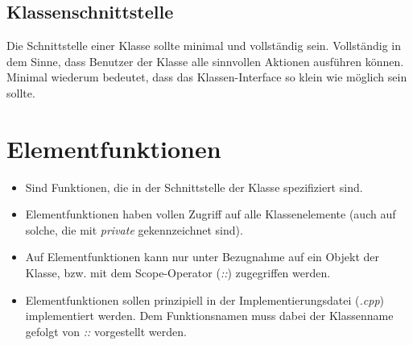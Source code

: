 \subsection{Klassenschnittstelle}
Die Schnittstelle einer Klasse sollte minimal und vollständig sein. Vollständig in dem Sinne, dass Benutzer der Klasse alle sinnvollen Aktionen ausführen können. Minimal wiederum bedeutet, dass das Klassen-Interface so klein wie möglich sein sollte.
\clearpage

\section{Elementfunktionen}
\begin{itemize}
	\item Sind Funktionen, die in der Schnittstelle der Klasse spezifiziert sind.
	\item Elementfunktionen haben vollen Zugriff auf alle Klassenelemente (auch auf solche, die mit \emph{private} gekennzeichnet sind).
	\item Auf Elementfunktionen kann nur unter Bezugnahme auf ein Objekt der Klasse, bzw. mit dem Scope-Operator (\emph{::}) zugegriffen werden.
	\item Elementfunktionen sollen prinzipiell in der Implementierungsdatei (\emph{.cpp}) implementiert werden. Dem Funktionsnamen muss dabei der Klassenname gefolgt von \emph{::} vorgestellt werden.
\end{itemize}

